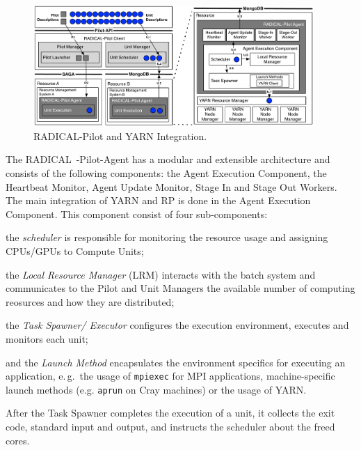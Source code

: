 \begin{figure}
    \centering
    \includegraphics[width=0.95\textwidth]{figures/data_analytics_hpc/hpc_hadoop/rp-architecture-yarn.pdf}
    \caption{RADICAL-Pilot and YARN Integration.\label{fig:comp_rp_arch}}
\end{figure}

The RADICAL~-Pilot-Agent has a modular and extensible architecture and consists of the following components: the Agent Execution Component, the Heartbeat Monitor, Agent Update Monitor, Stage In and Stage Out Workers.
The main integration of YARN and RP is done in the Agent Execution Component.
This component consist of four sub-components:
\begin{inparaenum}[a)]
    \item the \textit{scheduler} is responsible for monitoring the resource usage and assigning CPUs/GPUs to Compute Units;
    \item the \textit{Local Resource Manager} (LRM) interacts with the batch system and communicates to the Pilot and Unit Managers the available number of computing reosurces and how they are distributed;
    \item the \textit{Task Spawner/ Executor} configures the execution environment, executes and monitors each unit; 
    \item and the \textit{Launch Method} encapsulates the environment specifics for executing an application, e.\,g.\ the usage of \texttt{mpiexec} for MPI applications, machine-specific launch methods (e.g. \texttt{aprun} on Cray machines) or the usage of YARN.
\end{inparaenum}
After the Task Spawner completes the execution of a unit, it collects the exit code, standard input and output, and instructs the scheduler about the freed cores.


